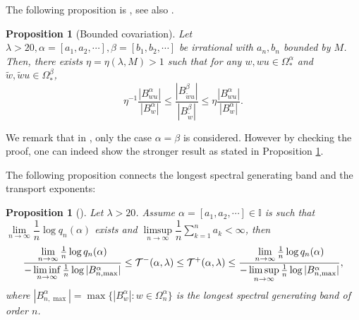 \documentclass[reqno,11pt,graphicx,]{amsart}
\numberwithin{equation}{section}
\theoremstyle{plain}
\newcommand{\I}{{\mathbb I}}
\newcommand{\3}{\mathbf{3}}
\newtheorem{proposition}[theorem]{Proposition}
\begin{document}
	The following proposition is \cite[Theorem 5.1]{FLW2011}, see also \cite[Theorem 3.3]{LQW2014}.
	
	\begin{proposition}[Bounded covariation]
		\label{bco-cor} Let $\lambda>20,\alpha=[a_1,a_2,\cdots],\beta=[b_1,b_2,%
		\cdots]$ be irrational with $a_n,b_n$ bounded by $M$. Then, 
		there exists $\eta=\eta(\lambda,M)>1$ such that for any $w,wu\in\Omega_\ast^{\alpha}$
		and $\widetilde{w}, \widetilde{w}u\in \Omega_\ast^{\beta}$,
		\begin{equation*}
			\eta^{-1} \frac{|{B}_{wu}^{\alpha}|}{|{B}_{w}^{\alpha}|}%
			\le \frac{|B_{\widetilde{w}u}^{\beta}|}{|B_{\widetilde{w}}^{\beta}|%
			}\le \eta \frac{|{B}_{wu}^{\alpha}|}{|{B}_{w}^{\alpha}|}.
		\end{equation*}
	\end{proposition}
	
	We remark that in \cite{FLW2011}, only the case $\alpha=\beta$ is considered. However by checking the proof, one can indeed show the stronger result as stated in Proposition \ref{bco-cor}. %
	
	The following proposition connects the longest spectral generating band and the transport exponents:
	\begin{proposition}[]\label{trans}
		Let $\lambda>20$. Assume $\alpha=[a_1,a_2,\cdots]\in\I$ is such that $\lim\limits_{n\to\infty}\dfrac{1}{n}\log q_n(\alpha)$ exists and $\limsup\limits_{n\to\infty}\dfrac{1}{n}\sum\limits_{k=1}^{n}
		a_k<\infty$, then 
		\begin{equation*}
			\frac{\lim\limits_{n\to\infty}\frac{1}{n}\log q_n(\alpha)}{%
				-\liminf\limits_{n\to\infty}\frac{1}{n}\log|B^{\alpha}_{n,\max}|}\leq
			\mathcal{T}^-(\alpha,\lambda)\leq\mathcal{T}^{+}(\alpha,\lambda)\leq%
			\frac{\lim\limits_{n\to\infty}\frac{1}{n}\log q_n(\alpha)}{%
				-\limsup\limits_{n\to\infty}\frac{1}{n}\log|B^{\alpha}_{n,\max}|},
		\end{equation*}
		where $|B^{\alpha}_{n,\max}|=\max\{|B^{\alpha}_w|:w\in\Omega^{\alpha}_n\}$ is the longest spectral generating band of order $n$. 
	\end{proposition}
	
\end{document}
